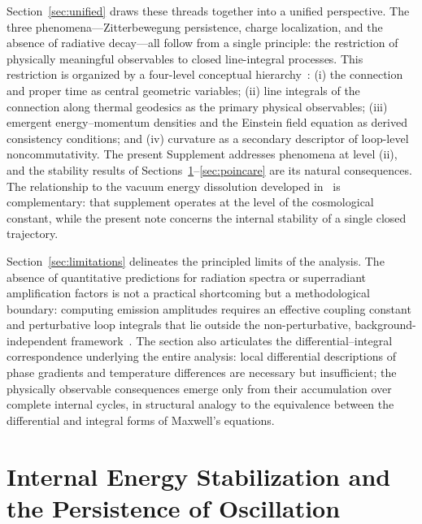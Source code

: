 \documentclass[12pt,a4paper]{article}
\begin{document}
Section~\ref{sec:unified} draws these threads together into a unified perspective. The three phenomena---Zitterbewegung persistence, charge localization, and the absence of radiative decay---all follow from a single principle: the restriction of physically meaningful observables to closed line-integral processes. This restriction is organized by a four-level conceptual hierarchy~\cite{hanamura18203433}: (i) the connection and proper time as central geometric variables; (ii) line integrals of the connection along thermal geodesics as the primary physical observables; (iii) emergent energy--momentum densities and the Einstein field equation as derived consistency conditions; and (iv) curvature as a secondary descriptor of loop-level noncommutativity. The present Supplement addresses phenomena at level (ii), and the stability results of Sections~\ref{sec:stabilization}--\ref{sec:poincare} are its natural consequences. The relationship to the vacuum energy dissolution developed in~\cite{hanamura18727981} is complementary: that supplement operates at the level of the cosmological constant, while the present note concerns the internal stability of a single closed trajectory.

Section~\ref{sec:limitations} delineates the principled limits of the analysis. The absence of quantitative predictions for radiation spectra or superradiant amplification factors is not a practical shortcoming but a methodological boundary: computing emission amplitudes requires an effective coupling constant and perturbative loop integrals that lie outside the non-perturbative, background-independent framework~\cite{hanamura18603340}. The section also articulates the differential--integral correspondence underlying the entire analysis: local differential descriptions of phase gradients and temperature differences are necessary but insufficient; the physically observable consequences emerge only from their accumulation over complete internal cycles, in structural analogy to the equivalence between the differential and integral forms of Maxwell's equations.

\section{Internal Energy Stabilization and the Persistence of Oscillation}
\label{sec:stabilization}

\justifying
\end{document}
